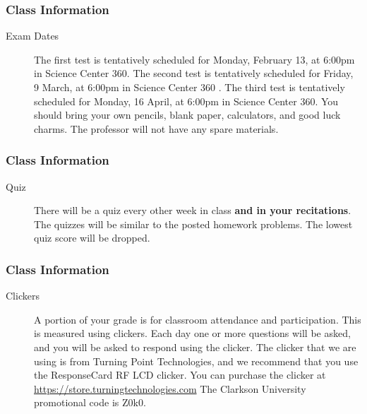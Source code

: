 \begin{frame}
  \frametitle{Class Information}

\begin{description}
  \item[Exam Dates] The first test is tentatively scheduled for
    Monday, February 13, at 6:00pm in Science Center 360. The second
    test is tentatively scheduled for Friday, 9 March, at 6:00pm in
    Science Center 360 . The third test is tentatively scheduled for
    Monday, 16 April, at 6:00pm in Science Center 360.  You should
    bring your own pencils, blank paper, calculators, and good luck
    charms.  The professor will not have any spare materials.

 
\end{description}

\end{frame}

\begin{frame}
  \frametitle{Class Information}

\begin{description}
\item[Quiz] There will be a quiz every other week in class \textbf{and
    in your recitations}. The quizzes will be similar to the posted
  homework problems. The lowest quiz score will be dropped.
\end{description}

\end{frame}


\begin{frame}
  \frametitle{Class Information}

\begin{description}
  \item[Clickers] A portion of your grade is for classroom attendance
    and participation. This is measured using clickers. Each day one
    or more questions will be asked, and you will be asked to respond
    using the clicker. The clicker that we are using is from Turning
    Point Technologies, and we recommend that you use the ResponseCard
    RF LCD clicker. You can purchase the clicker at
    \url{https://store.turningtechnologies.com} The Clarkson
    University promotional code is Z0k0.

\end{description}

\end{frame}


